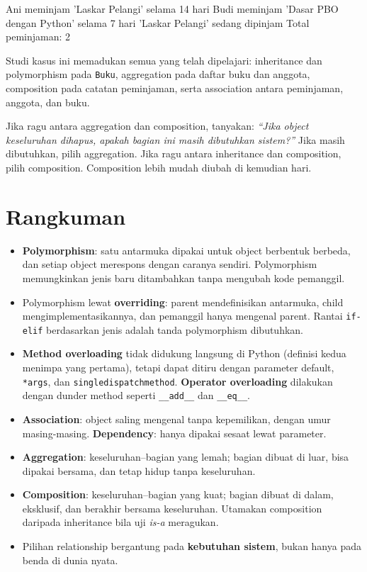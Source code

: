 \begin{keluaran}
Ani meminjam 'Laskar Pelangi' selama 14 hari
Budi meminjam 'Dasar PBO dengan Python' selama 7 hari
'Laskar Pelangi' sedang dipinjam
Total peminjaman: 2
\end{keluaran}

Studi kasus ini memadukan semua yang telah dipelajari: inheritance dan polymorphism pada \texttt{Buku}, aggregation pada daftar buku dan anggota, composition pada catatan peminjaman, serta association antara peminjaman, anggota, dan buku.

\begin{tips}
Jika ragu antara aggregation dan composition, tanyakan: \emph{``Jika object keseluruhan dihapus, apakah bagian ini masih dibutuhkan sistem?''} Jika masih dibutuhkan, pilih aggregation. Jika ragu antara inheritance dan composition, pilih composition. Composition lebih mudah diubah di kemudian hari.
\end{tips}

\section{Rangkuman}

\begin{itemize}
  \item \textbf{Polymorphism}: satu antarmuka dipakai untuk object berbentuk berbeda, dan setiap object merespons dengan caranya sendiri. Polymorphism memungkinkan jenis baru ditambahkan tanpa mengubah kode pemanggil.
  \item Polymorphism lewat \textbf{overriding}: parent mendefinisikan antarmuka, child mengimplementasikannya, dan pemanggil hanya mengenal parent. Rantai \texttt{if-elif} berdasarkan jenis adalah tanda polymorphism dibutuhkan.
  \item \textbf{Method overloading} tidak didukung langsung di Python (definisi kedua menimpa yang pertama), tetapi dapat ditiru dengan parameter default, \texttt{*args}, dan \texttt{singledispatchmethod}. \textbf{Operator overloading} dilakukan dengan dunder method seperti \texttt{\_\_add\_\_} dan \texttt{\_\_eq\_\_}.
  \item \textbf{Association}: object saling mengenal tanpa kepemilikan, dengan umur masing-masing. \textbf{Dependency}: hanya dipakai sesaat lewat parameter.
  \item \textbf{Aggregation}: keseluruhan--bagian yang lemah; bagian dibuat di luar, bisa dipakai bersama, dan tetap hidup tanpa keseluruhan.
  \item \textbf{Composition}: keseluruhan--bagian yang kuat; bagian dibuat di dalam, eksklusif, dan berakhir bersama keseluruhan. Utamakan composition daripada inheritance bila uji \emph{is-a} meragukan.
  \item Pilihan relationship bergantung pada \textbf{kebutuhan sistem}, bukan hanya pada benda di dunia nyata.
\end{itemize}

